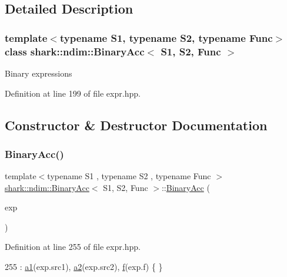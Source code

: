 \subsection{Detailed Description}
\subsubsection*{template$<$typename S1, typename S2, typename Func$>$\newline
class shark\+::ndim\+::\+Binary\+Acc$<$ S1, S2, Func $>$}

Binary expressions 

Definition at line 199 of file expr.\+hpp.



\subsection{Constructor \& Destructor Documentation}
\hypertarget{classshark_1_1ndim_1_1_binary_acc_aa7c63a66a1512bfac1e10078b309d68d}{}\label{classshark_1_1ndim_1_1_binary_acc_aa7c63a66a1512bfac1e10078b309d68d} 
\subsubsection{\texorpdfstring{Binary\+Acc()}{BinaryAcc()}}
{\footnotesize\ttfamily template$<$typename S1 , typename S2 , typename Func $>$ \\
\hyperlink{classshark_1_1ndim_1_1_binary_acc}{shark\+::ndim\+::\+Binary\+Acc}$<$ S1, S2, Func $>$\+::\hyperlink{classshark_1_1ndim_1_1_binary_acc}{Binary\+Acc} (\begin{DoxyParamCaption}\item[{const \hyperlink{classshark_1_1ndim_1_1_binary_exp}{Binary\+Exp}$<$ S1, S2, Func $>$ \&}]{exp }\end{DoxyParamCaption})}



Definition at line 255 of file expr.\+hpp.


\begin{DoxyCode}
255 : \hyperlink{classshark_1_1ndim_1_1_binary_acc_ad506fa496dc01e94b8e40cce878d55e4}{a1}(exp.src1), \hyperlink{classshark_1_1ndim_1_1_binary_acc_a85cdf9eb043152a0c54bf58809edf165}{a2}(exp.src2), \hyperlink{classshark_1_1ndim_1_1_binary_acc_ab0c1983b8ee09760742353828229262f}{f}(exp.f) \{ \}
\end{DoxyCode}
\hypertarget{classshark_1_1ndim_1_1_binary_acc_ac44c7e3de12bdbf2c5051a641cb25e40}{}\label{classshark_1_1ndim_1_1_binary_acc_ac44c7e3de12bdbf2c5051a641cb25e40} 
